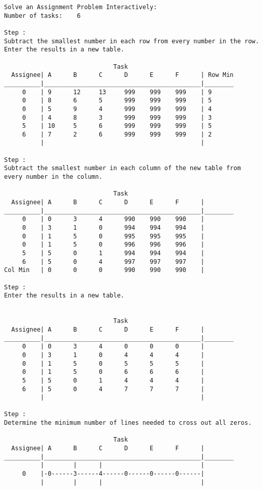 \documentclass[titlepage, letterpaper]{article}
\begin{document}
\begin{lstlisting}[basicstyle=\tiny]



Solve an Assignment Problem Interactively:
Number of tasks:    6

Step :
Subtract the smallest number in each row from every number in the row.
Enter the results in a new table.

                              Task
  Assignee| A      B      C      D      E      F      | Row Min
__________|___________________________________________|________
     0    | 9      12     13     999    999    999    | 9
     0    | 8      6      5      999    999    999    | 5
     0    | 5      9      4      999    999    999    | 4
     0    | 4      8      3      999    999    999    | 3
     5    | 10     5      6      999    999    999    | 5
     6    | 7      2      6      999    999    999    | 2
          |                                           | 

Step :
Subtract the smallest number in each column of the new table from every number in the column.

                              Task
  Assignee| A      B      C      D      E      F      |
__________|___________________________________________|________
     0    | 0      3      4      990    990    990    | 
     0    | 3      1      0      994    994    994    | 
     0    | 1      5      0      995    995    995    | 
     0    | 1      5      0      996    996    996    | 
     5    | 5      0      1      994    994    994    | 
     6    | 5      0      4      997    997    997    | 
Col Min   | 0      0      0      990    990    990    | 

Step :
Enter the results in a new table.


                              Task
  Assignee| A      B      C      D      E      F      |
__________|___________________________________________|________
     0    | 0      3      4      0      0      0      | 
     0    | 3      1      0      4      4      4      | 
     0    | 1      5      0      5      5      5      | 
     0    | 1      5      0      6      6      6      | 
     5    | 5      0      1      4      4      4      | 
     6    | 5      0      4      7      7      7      | 
          |                                           | 

Step :
Determine the minimum number of lines needed to cross out all zeros.

                              Task
  Assignee| A      B      C      D      E      F      |
__________|___________________________________________|________
          |        |      |                           |
     0    |-0------3------4------0------0------0------|
          |        |      |                           |



\end{lstlisting}
\end{document}
